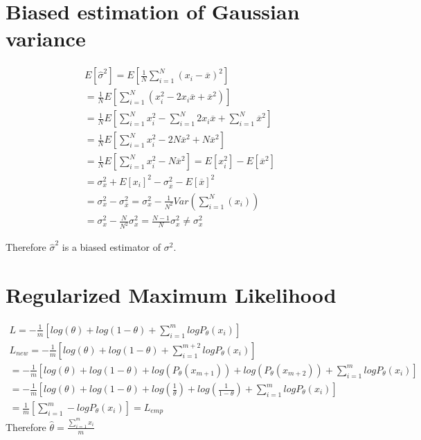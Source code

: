 \documentclass{article}
\begin{document}
\section{Biased estimation of Gaussian variance}

\begin{equation}
\begin{split}
E [ \hat { \sigma } ^ { 2 } ] = E [ \frac { 1 } { N } \sum _ { i = 1 } ^ { N } ( x _ { i } - \overline { x } ) ^ { 2 } ]  \\
= \frac { 1 } { N } E [ \sum _ { i = 1 } ^ { N } ( x _ { i } ^ { 2 } - 2 x _ { i } \overline { x } + \overline { x } ^ { 2 } ) ]  \\ 
= \frac { 1 } { N } E [ \sum _ {i = 1} ^ { N } x _ { i } ^ { 2 } - \sum _ {i = 1}^ { N } 2 x _ { i} \overline { x } + \sum_ {i = 1} ^ { N } \overline { x } ^ { 2 } ] \\
= \frac { 1 } { N } E [ \sum _ {i = 1} ^ { N } x _ { i } ^ { 2 } - 2N \overline { x }^{2} + N \overline { x } ^ { 2 } ] \\
= \frac { 1 } { N } E [ \sum _ {i = 1} ^ { N } x _ { i } ^ { 2 } - N \overline { x } ^ { 2 } ]  = E [  x _ { i } ^ { 2 } ]- E[\overline { x } ^ { 2 } ]  \\
= \sigma _ { x } ^ { 2 } + E [ x _ { i } ] ^ { 2 } - \sigma _ { \overline { x } } ^ { 2 } - E [ \overline { x }  ] ^ { 2 } \\
= \sigma _ { x } ^ { 2 } - \sigma _ { \overline x } ^ { 2 }  = \sigma _ { x } ^ { 2 } - \frac{1}{N^2}Var(\sum _ { i = 1 } ^ { N } ( x _ { i } )) \\ 
= \sigma _ { x } ^ { 2 } - \frac{N}{N^2}\sigma _ { x } ^ { 2 } =  \frac{N-1}{N}\sigma _ { x } ^ { 2 } \neq \sigma _ { x } ^ { 2 }
\end{split}
\end{equation}

Therefore  \(\hat { \sigma } ^ { 2 }\) is a biased estimator of \({ \sigma } ^ { 2 }\).



\section{Regularized Maximum Likelihood}
\begin{equation}
\begin{split}
L = -\frac{1}{m} [ log(\theta) + log(1-\theta) + \sum_{i=1}^{m} logP_\theta (x_i) ] \\
L_{new} = -\frac{1}{m} [ log(\theta) + log(1-\theta) + \sum_{i=1}^{m+2} logP_\theta (x_i) ] \\
= -\frac{1}{m} [ log(\theta) + log(1-\theta) + log (P_\theta (x_{m+1})) + log (P_\theta (x_{m+2})) + \sum_{i=1}^{m} logP_\theta (x_i) ] \\
= - \frac{1}{m} [ log(\theta) + log(1-\theta) + log(\frac{1}{\theta}) + log(\frac{1}{1-\theta})  + \sum_{i=1}^{m} logP_\theta (x_i) ] \\
= \frac{1}{m}[\sum_{i=1}^{m} -logP_\theta (x_i) ] = L_{emp}
\end{split}
\end{equation}
Therefore \(\hat{\theta} = \frac{\sum_{i=1}^{m}x_i}{m} \)
\end{document}
